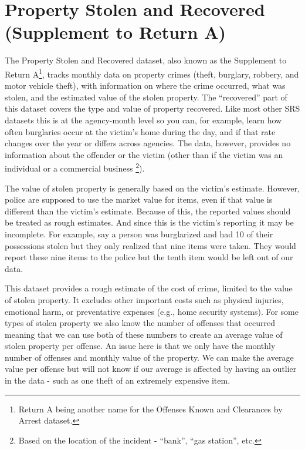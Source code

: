 \documentclass[
]{krantz}
\begin{document}
\chapter{Property Stolen and Recovered (Supplement to Return
A)}\label{stolen_property}

The Property Stolen and Recovered dataset, also known as the
Supplement to Return A\footnote{Return A being another name
  for the Offenses Known and Clearances by Arrest dataset.},
tracks monthly data on property crimes (theft, burglary,
robbery, and motor vehicle theft), with information on where
the crime occurred, what was stolen, and the estimated value
of the stolen property. The ``recovered'' part of this
dataset covers the type and value of property recovered.
Like most other SRS datasets this is at the agency-month
level so you can, for example, learn how often burglaries
occur at the victim's home during the day, and if that rate
changes over the year or differs across agencies. The data,
however, provides no information about the offender or the
victim (other than if the victim was an individual or a
commercial business \footnote{Based on the location of the
  incident - ``bank'', ``gas station'', etc.}).

The value of stolen property is generally based on the
victim's estimate. However, police are supposed to use the
market value for items, even if that value is different than
the victim's estimate. Because of this, the reported values
should be treated as rough estimates. And since this is the
victim's reporting it may be incomplete. For example, say a
person was burglarized and had 10 of their possessions
stolen but they only realized that nine items were taken.
They would report these nine items to the police but the
tenth item would be left out of our data.

This dataset provides a rough estimate of the cost of crime,
limited to the value of stolen property. It excludes other
important costs such as physical injuries, emotional harm,
or preventative expenses (e.g., home security systems). For
some types of stolen property we also know the number of
offenses that occurred meaning that we can use both of these
numbers to create an average value of stolen property per
offense. An issue here is that we only have the monthly
number of offenses and monthly value of the property. We can
make the average value per offense but will not know if our
average is affected by having an outlier in the data - such
as one theft of an extremely expensive item.
\end{document}
